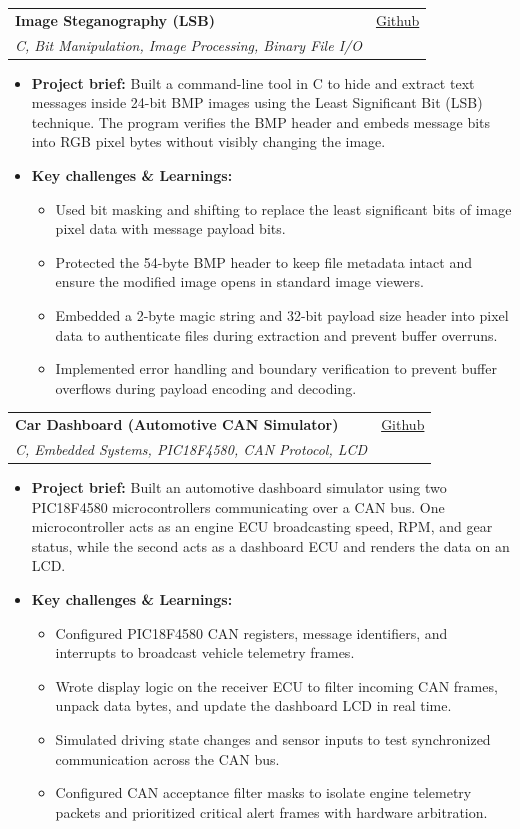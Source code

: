 \documentclass[letterpaper,11pt]{article}
\makeatletter
\newcommand{\resumeItem}[1]{
  \item
    {#1 \vspace{-3pt}}
}
\newcommand{\resumeSubheading}[4]{
  \vspace{-3pt}\item
    \begin{tabular*}{0.97\textwidth}[t]{l@{\extracolsep{\fill}}r}
      \textbf{#1} & #2 \\
      \textit{#3} & {#4} \\
    \end{tabular*}\vspace{-8pt}
}
\newcommand{\resumeItemListStart}{\begin{itemize}[topsep=1pt, itemsep=0.5pt, parsep=0pt]}
\newcommand{\resumeItemListEnd}{\end{itemize}\vspace{-6pt}}
\makeatother
\begin{document}
    \resumeSubheading
      {Image Steganography (LSB)}{\href{https://github.com/k0-R0/Steganography}{Github}}
      {C, Bit Manipulation, Image Processing, Binary File I/O}{}
      \resumeItemListStart
        \resumeItem{\textbf{Project brief:} Built a command-line tool in C to hide and extract text messages inside 24-bit BMP images using the Least Significant Bit (LSB) technique. The program verifies the BMP header and embeds message bits into RGB pixel bytes without visibly changing the image.}
        \resumeItem{\textbf{Key challenges \& Learnings:}}
        \resumeItemListStart
            \resumeItem{Used bit masking and shifting to replace the least significant bits of image pixel data with message payload bits.}
            \resumeItem{Protected the 54-byte BMP header to keep file metadata intact and ensure the modified image opens in standard image viewers.}
            \resumeItem{Embedded a 2-byte magic string and 32-bit payload size header into pixel data to authenticate files during extraction and prevent buffer overruns.}
            \resumeItem{Implemented error handling and boundary verification to prevent buffer overflows during payload encoding and decoding.}
        \resumeItemListEnd
      \resumeItemListEnd

    \resumeSubheading
      {Car Dashboard (Automotive CAN Simulator)}{\href{https://github.com/k0-R0/Car_Dashboard}{Github}}
      {C, Embedded Systems, PIC18F4580, CAN Protocol, LCD}{}
      \resumeItemListStart
        \resumeItem{\textbf{Project brief:} Built an automotive dashboard simulator using two PIC18F4580 microcontrollers communicating over a CAN bus. One microcontroller acts as an engine ECU broadcasting speed, RPM, and gear status, while the second acts as a dashboard ECU and renders the data on an LCD.}
        \resumeItem{\textbf{Key challenges \& Learnings:}}
        \resumeItemListStart
            \resumeItem{Configured PIC18F4580 CAN registers, message identifiers, and interrupts to broadcast vehicle telemetry frames.}
            \resumeItem{Wrote display logic on the receiver ECU to filter incoming CAN frames, unpack data bytes, and update the dashboard LCD in real time.}
            \resumeItem{Simulated driving state changes and sensor inputs to test synchronized communication across the CAN bus.}
            \resumeItem{Configured CAN acceptance filter masks to isolate engine telemetry packets and prioritized critical alert frames with hardware arbitration.}
        \resumeItemListEnd
      \resumeItemListEnd

  \newpage
\end{document}
